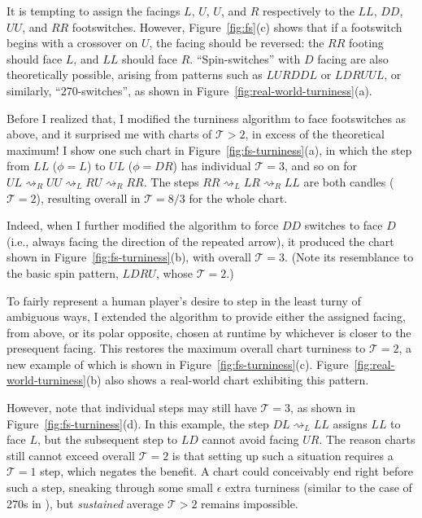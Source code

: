 \documentclass[10pt]{sigplanconf}
\begin{document}
It is tempting to assign the facings $L$, $U$, $U$, and $R$ respectively to the $LL$, $DD$, $UU$, and $RR$ footswitches.
However, Figure~\ref{fig:fs}(c) shows that if a footswitch begins with a crossover on $U$, the facing should be reversed:
the $RR$ footing should face $L$, and $LL$ should face $R$.
``Spin-switches'' with $D$ facing are also theoretically possible,
arising from patterns such as $LURDDL$ or $LDRUUL$,
or similarly, ``270-switches'', as shown in Figure~\ref{fig:real-world-turniness}(a).

Before I realized that, I modified the turniness algorithm \cite{turniness} to face footswitches as above, %
and it surprised me with charts of $\mathcal{T}>2$, in excess of the theoretical maximum!
I show one such chart in Figure~\ref{fig:fs-turniness}(a), in which the step from $LL$ ($\phi=L$) to $UL$ ($\phi=DR$) has individual $\mathcal{T}=3$, and so on for $UL \rightsquigarrow_R UU \rightsquigarrow_L RU \rightsquigarrow_R RR$.
The steps $RR \rightsquigarrow_L LR \rightsquigarrow_R LL$ are both candles ($\mathcal{T}=2$),
resulting overall in $\mathcal{T}=8/3$ for the whole chart.

Indeed, when I further modified the algorithm to force $DD$ switches to face $D$ (i.e., always facing the direction of the repeated arrow),
it produced the chart shown in Figure~\ref{fig:fs-turniness}(b), with overall $\mathcal{T}=3$.
(Note its resemblance to the basic spin pattern, $LDRU$, whose $\mathcal{T}=2$.)

To fairly represent a human player's desire to step in the least turny of ambiguous ways,
I extended the algorithm to provide either the assigned facing, from above, or its polar opposite,
chosen at runtime by whichever is closer to the presequent facing.
This restores the maximum overall chart turniness to $\mathcal{T}=2$,
a new example of which is shown in Figure~\ref{fig:fs-turniness}(c).
Figure~\ref{fig:real-world-turniness}(b) also shows a real-world chart exhibiting this pattern.

However, note that individual steps may still have $\mathcal{T}=3$,
as shown in Figure~\ref{fig:fs-turniness}(d).
In this example, the step $DL \rightsquigarrow_L LL$ assigns $LL$ to face $L$,
but the subsequent step to $LD$ cannot avoid facing $UR$.
The reason charts still cannot exceed overall $\mathcal{T}=2$ is that
setting up such a situation requires a $\mathcal{T}=1$ step,
which negates the benefit.
A chart could conceivably end right before such a step,
sneaking through some small $\epsilon$ extra turniness \cite{epsilon}
(similar to the case of 270s in \cite{turniness}),
but {\em sustained} average $\mathcal{T}>2$ remains impossible.
\end{document}
